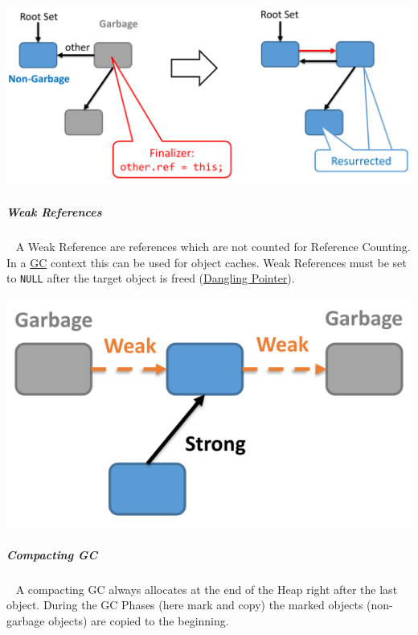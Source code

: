 \documentclass[11pt,twoside,landscape]{article}
\begin{document}
\begin{multicols}{3}
{
\begin{center}
\includegraphics[width=.9\linewidth]{img/resurrection_example.png}
\end{center}
\label{fig:resurrection-example}
}
\subparagraph{Weak References} \
\label{sec:org8694543}
A Weak Reference are references which are not counted for Reference Counting.
In a \href{../../../roam/20211008083744-garbage_collection.org}{GC} context this can be used for object caches.
Weak References must be set to \texttt{NULL} after the target object is freed (\href{../../../roam/20221230183145-what_is_a_dangling_pointer.org}{Dangling Pointer}).

{
\begin{center}
\includegraphics[width=.9\linewidth]{img/weak_reference.png}
\end{center}
\label{fig:weak-reference-example}
}

\subparagraph{Compacting GC} \
\label{sec:orga4fe092}
A compacting GC always allocates at the end of the Heap right after the last object.
During the GC Phases (here mark and copy) the marked objects (non-garbage objects) are copied to the beginning.



\end{multicols}
\end{document}

